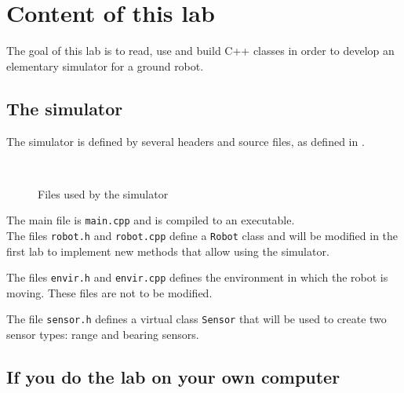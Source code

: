 \documentclass{ecnreport}
\begin{document}



\section{Content of this lab}

The goal of this lab is to read, use and build C++ classes in order to develop an elementary simulator for a ground robot.

\subsection{The simulator}

The simulator is defined by several headers and source files, as defined in .
\begin{figure}[h]
\begin{minipage}{.25\linewidth} ~ \end{minipage}
\begin{minipage}{.5\linewidth}
\end{minipage}
\caption{\label{fig:dirtree} Files used by the simulator}
\end{figure}

The main file is \texttt{main.cpp} and is compiled to an executable.\\
The files \texttt{robot.h} and \texttt{robot.cpp} define a \texttt{Robot} class and will be modified in the first lab to implement new methods that allow using the simulator.

The files \texttt{envir.h} and \texttt{envir.cpp} defines the environment in which the robot is moving. These files are not to be modified.

The file \texttt{sensor.h} defines a virtual class \texttt{Sensor} that will be used to create two sensor types: range and bearing sensors.

\subsection{If you do the lab on your own computer}
\end{document}
